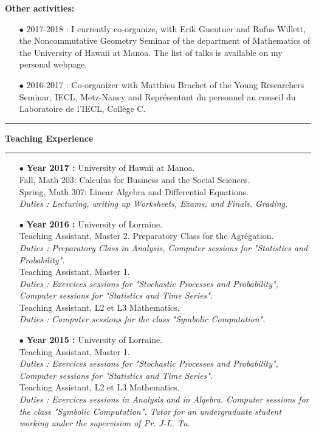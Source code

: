 \documentclass[a4paper,11pt]{article}
\newcommand{\titre}[1]{%
	\begin{center}
	\bigskip
	\rule{\textwidth}{1pt}
	\par\vspace{0.1cm}
        \textbf{\large #1}
	\par\rule{\textwidth}{1pt}
	\end{center}
	\bigskip
	}
\begin{document}
\textbf{Other activities:} 
\begin{itemize}
\item[$\bullet$] 2017-2018 : I currently co-organize, with Erik Guentner and Rufus Willett, the Noncommutative Geometry Seminar of the department of Mathematics of the University of Hawaii at Manoa. The list of talks is available on my personal webpage.
\item[$\bullet$] 2016-2017 : Co-organizer with Matthieu Brachet of the Young Researchers Seminar, IECL, Metz-Nancy and Représentant du personnel au conseil du Laboratoire de l'IECL, Collège C.
\end{itemize}

\newpage
\titre{Teaching Experience}

\begin{itemize}
\item[$\bullet$] \textbf{ Year 2017 :} University of Hawaii at Manoa.\\
					Fall, Math 203: Calculus for Business and the Social Sciences.\\
					Spring, Math 307: Linear Algebra and Differential Equations.\\
					\textit{Duties : Lecturing, writing up Worksheets, Exams, and Finals. Grading.}\\

\item[$\bullet$] \textbf{ Year 2016 :} University of Lorraine.\\
					Teaching Assistant, Master 2. Preparatory Class for the Agrégation.\\
					\textit{Duties : Preparatory Class in Analysis, Computer sessions for "Statistics and Probability".}\\
					Teaching Assistant, Master 1.\\
					\textit{Duties : Exercices sessions for "Stochastic Processes and Probability", Computer sessions for "Statistics and Time Series".}\\
					Teaching Assistant, L2 et L3 Mathematics. \\
					\textit{Duties : Computer sessions for the class "Symbolic Computation".}\\   
\item[$\bullet$] \textbf{ Year 2015 :} University of Lorraine.\\
					Teaching Assistant, Master 1.\\
					\textit{Duties : Exercices sessions for "Stochastic Processes and Probability", Computer sessions for "Statistics and Time Series".}\\
					Teaching Assistant, L2 et L3 Mathematics. \\
					\textit{Duties : Exercices sessions in Analysis and in Algebra. Computer sessions for the class "Symbolic Computation". Tutor for an undergraduate student working under the supervision of Pr. J-L. Tu.}\\   
					

\end{itemize}
\end{document}
